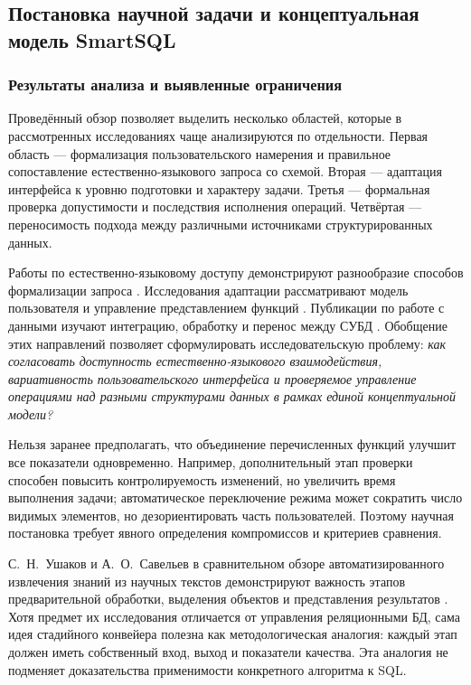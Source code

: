 \subsection{Постановка научной задачи и концептуальная модель SmartSQL}
\subsubsection{Результаты анализа и выявленные ограничения}

Проведённый обзор позволяет выделить несколько областей, которые в рассмотренных исследованиях чаще анализируются по отдельности. Первая область — формализация пользовательского намерения и правильное сопоставление естественно-языкового запроса со схемой. Вторая — адаптация интерфейса к уровню подготовки и характеру задачи. Третья — формальная проверка допустимости и последствия исполнения операций. Четвёртая — переносимость подхода между различными источниками структурированных данных.

Работы по естественно-языковому доступу демонстрируют разнообразие способов формализации запроса \cite{posevkin2018,almuhammed2022,majeed2022}. Исследования адаптации рассматривают модель пользователя и управление представлением функций \cite{tagirova2022,abrahao2021}. Публикации по работе с данными изучают интеграцию, обработку и перенос между СУБД \cite{zayakin2022,voronchikhin2024}. Обобщение этих направлений позволяет сформулировать исследовательскую проблему: \emph{как согласовать доступность естественно-языкового взаимодействия, вариативность пользовательского интерфейса и проверяемое управление операциями над разными структурами данных в рамках единой концептуальной модели?}

Нельзя заранее предполагать, что объединение перечисленных функций улучшит все показатели одновременно. Например, дополнительный этап проверки способен повысить контролируемость изменений, но увеличить время выполнения задачи; автоматическое переключение режима может сократить число видимых элементов, но дезориентировать часть пользователей. Поэтому научная постановка требует явного определения компромиссов и критериев сравнения.

С.~Н.~Ушаков и А.~О.~Савельев в сравнительном обзоре автоматизированного извлечения знаний из научных текстов демонстрируют важность этапов предварительной обработки, выделения объектов и представления результатов \cite{ushakov2024}. Хотя предмет их исследования отличается от управления реляционными БД, сама идея стадийного конвейера полезна как методологическая аналогия: каждый этап должен иметь собственный вход, выход и показатели качества. Эта аналогия не подменяет доказательства применимости конкретного алгоритма к SQL.

